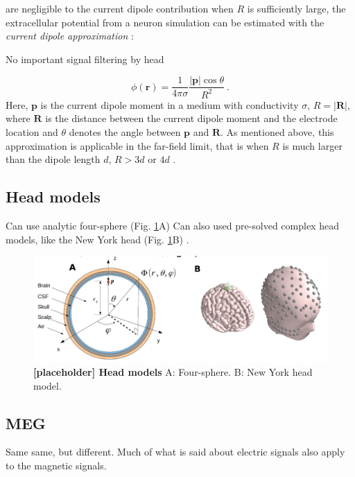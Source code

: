 \documentclass[preprint,11pt,authoryear]{elsarticle}
\begin{document}
are negligible to the current dipole contribution when $R$ is sufficiently large, the extracellular potential from a neuron simulation can be estimated with the \textit{current dipole approximation} \citep{Pettersen2008, Pettersen2014, Nunez2006}:

No important signal filtering by head \citep{Pfurtscheller1975, Ranta2017}

\begin{equation}
\phi(\mathbf{r}) = \frac{1}{4 \pi \sigma} \frac{|\mathbf{p}| \cos \theta}{R^2}~.
\label{eq:dipole}
\end{equation}
Here, $\mathbf{p}$ is the current dipole moment in a medium with conductivity $\sigma$, $R = |\mathbf{R}|$, where $\mathbf{R}$ is the distance between the current dipole moment and the electrode location and $\theta$ denotes the angle between $\mathbf{p}$ and $\mathbf{R}$. As mentioned above, this approximation is applicable in the far-field limit, that is when $R$ is much larger than the dipole length $d$, $R > 3d$ or $4d$ \citep{Nunez2006}.

\subsection{Head models}
Can use analytic four-sphere (Fig. \ref{fig:head_models}A) \citep{Hagen2018, Naess2017}
Can also used pre-solved complex head models, like the New York head (Fig. \ref{fig:head_models}B) \citep{Huang2016}.

\begin{figure}[h!]
\begin{center}
\includegraphics[width=1\textwidth]{head_models.png}
\end{center}
\caption{\textbf{[placeholder] Head models} A: Four-sphere. B: New York head model.}
\label{fig:head_models}
\end{figure}
\subsection{MEG}
Same same, but different. 
Much of what is said about electric signals also apply to the magnetic signals.
\end{document}
